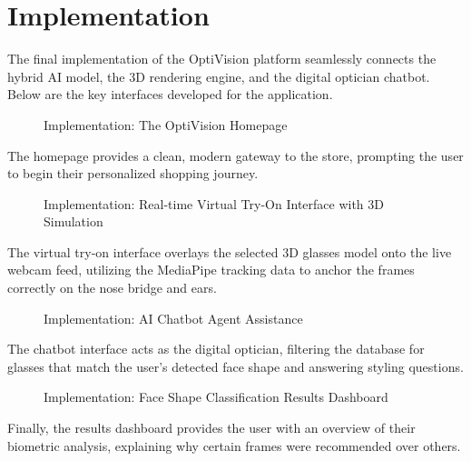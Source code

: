 \section{Implementation}
\label{sec:meth_implementation}

The final implementation of the OptiVision platform seamlessly connects the hybrid AI model, the 3D rendering engine, and the digital optician chatbot. Below are the key interfaces developed for the application.

\begin{figure}[H]
    \centering
    \vspace{8cm} 
    \caption{Implementation: The OptiVision Homepage}
    \label{fig:impl_homepage}
\end{figure}

The homepage provides a clean, modern gateway to the store, prompting the user to begin their personalized shopping journey.

\begin{figure}[H]
    \centering
    \vspace{8cm} 
    \caption{Implementation: Real-time Virtual Try-On Interface with 3D Simulation}
    \label{fig:impl_virtual_tryon}
\end{figure}

The virtual try-on interface overlays the selected 3D glasses model onto the live webcam feed, utilizing the MediaPipe tracking data to anchor the frames correctly on the nose bridge and ears.

\begin{figure}[H]
    \centering
    \vspace{8cm} 
    \caption{Implementation: AI Chatbot Agent Assistance}
    \label{fig:impl_chatbot}
\end{figure}

The chatbot interface acts as the digital optician, filtering the database for glasses that match the user's detected face shape and answering styling questions.

\begin{figure}[H]
    \centering
    \vspace{8cm} 
    \caption{Implementation: Face Shape Classification Results Dashboard}
    \label{fig:impl_classification}
\end{figure}

Finally, the results dashboard provides the user with an overview of their biometric analysis, explaining why certain frames were recommended over others.
